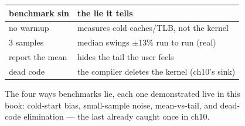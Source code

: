 \begin{figure}[htbp]
\centering
\begin{tabular}{ll}
\toprule
benchmark sin & the lie it tells \\
\midrule
no warmup & measures cold caches/TLB, not the kernel \\
3 samples & median swings $\pm$13\% run to run (real) \\
report the mean & hides the tail the user feels \\
dead code & the compiler deletes the kernel (ch10's sink) \\
\bottomrule
\end{tabular}
\caption{The four ways benchmarks lie, each one demonstrated live in
this book: cold-start bias, small-sample noise, mean-vs-tail, and
dead-code elimination --- the last already caught once in ch10.}
\label{fig:warmup15}
\end{figure}
